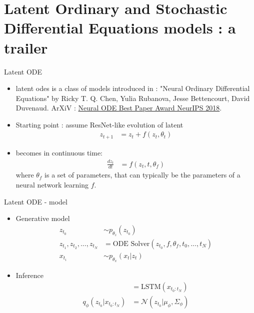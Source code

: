 \section{Latent Ordinary and Stochastic Differential Equations models : a trailer}\label{Latent Ordinary and Stochastic Differential Equations models}

\begin{frame}{Latent ODE}
    \begin{itemize}
        \item \glspl{latent ode} is a class of models introduced in \cite{chen_neural_2019} : "Neural Ordinary Differential Equations" 
by Ricky T. Q. Chen, Yulia Rubanova, Jesse Bettencourt, David Duvenaud. 
ArXiV : \href{https://arxiv.org/abs/1806.07366}{Neural ODE Best Paper Award NeurIPS 2018}.
        \item Starting point : assume ResNet-like evolution of latent
            \begin{align}
                z_{t+1} &= z_t + f(z_t, \theta_t)
            \end{align}
        \item becomes in continuous time:
        \begin{align}
                \frac{dz_t}{dt} &= f(z_t, t, \theta_f)
        \end{align}
            where $\theta_f$ is a set of parameters, that can typically be the parameters of 
            a neural network learning $f$.
    \end{itemize}
\end{frame}

\begin{frame}{Latent ODE - model}
    \begin{itemize}
        \item Generative model
            \begin{align}
                z_{t_0} &\sim p_{\theta_z}(z_{t_0}) \\
                z_{t_1}, z_{t_2}, ..., z_{t_N} &= \text{ODE Solver}(z_{t_0}, f, \theta_f, t_0, ..., t_N ) \\
                x_{t_i} &\sim p_{\theta_x}(x_t \vert z_t)
            \end{align}
        \item Inference
        \begin{align}
                [\mu_\phi, \Sigma_\phi] &= \text{LSTM} (x_{t_0:t_N})   \\
                q_{\phi}(z_{t_0} \vert x_{t_0:t_N}) &= \mathcal{N}(z_{t_0} \vert \mu_{\phi}, \Sigma_\phi)
        \end{align}
    \end{itemize}
\end{frame}

